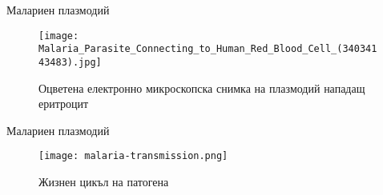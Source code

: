 \begin{frame}[t]{Малариен плазмодий}
  \begin{figure}
    \texttt{[image: Malaria\_Parasite\_Connecting\_to\_Human\_Red\_Blood\_Cell\_(34034143483).jpg]}
    \centering
    \caption{Оцветена електронно микроскопска снимка на плазмодий нападащ еритроцит}
  \end{figure}
\end{frame}

\begin{frame}[t]{Малариен плазмодий}
  \begin{figure}
    \texttt{[image: malaria-transmission.png]}
    \centering
    \caption{Жизнен цикъл на патогена}
  \end{figure}
\end{frame}

